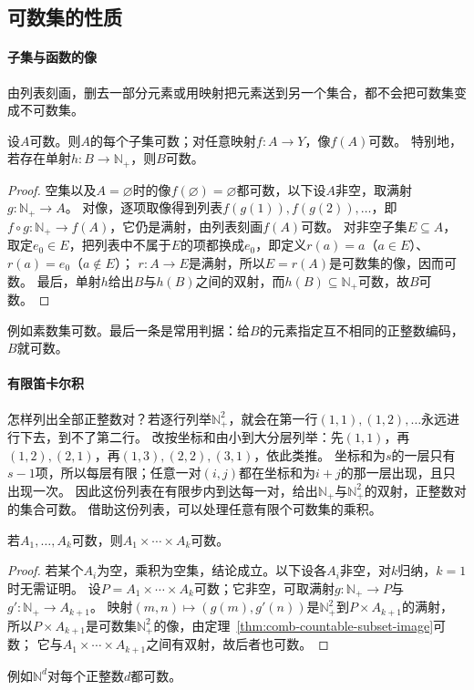 \subsection{可数集的性质}
\label{sec:countable-set-properties}

\paragraph{子集与函数的像}
由列表刻画，删去一部分元素或用映射把元素送到另一个集合，都不会把可数集变成不可数集。
\begin{theorem}[子集与像的可数性]
\label{thm:comb-countable-subset-image}
设$A$可数。则$A$的每个子集可数；对任意映射$f:A\to Y$，像$f(A)$可数。
特别地，若存在单射$h:B\to\mathbb N_+$，则$B$可数。
\end{theorem}
\begin{proof}
空集以及$A=\varnothing$时的像$f(\varnothing)=\varnothing$都可数，以下设$A$非空，取满射$g:\mathbb N_+\to A$。
对像，逐项取像得到列表$f(g(1)),f(g(2)),\ldots$，即$f\circ g:\mathbb N_+\to f(A)$，它仍是满射，由列表刻画$f(A)$可数。
对非空子集$E\subseteq A$，取定$e_0\in E$，把列表中不属于$E$的项都换成$e_0$，即定义$r(a)=a$（$a\in E$）、$r(a)=e_0$（$a\notin E$）；
$r:A\to E$是满射，所以$E=r(A)$是可数集的像，因而可数。
最后，单射$h$给出$B$与$h(B)$之间的双射，而$h(B)\subseteq\mathbb N_+$可数，故$B$可数。
\end{proof}
例如素数集可数。最后一条是常用判据：给$B$的元素指定互不相同的正整数编码，$B$就可数。

\paragraph{有限笛卡尔积}
怎样列出全部正整数对？若逐行列举$\mathbb N_+^2$，就会在第一行$(1,1),(1,2),\ldots$永远进行下去，到不了第二行。
改按坐标和由小到大分层列举：先$(1,1)$，再$(1,2),(2,1)$，再$(1,3),(2,2),(3,1)$，依此类推。
坐标和为$s$的一层只有$s-1$项，所以每层有限；任意一对$(i,j)$都在坐标和为$i+j$的那一层出现，且只出现一次。
因此这份列表在有限步内到达每一对，给出$\mathbb N_+$与$\mathbb N_+^2$的双射，正整数对的集合可数。
借助这份列表，可以处理任意有限个可数集的乘积。
\begin{theorem}[有限笛卡尔积的可数性]
\label{thm:comb-countable-product}
若$A_1,\ldots,A_k$可数，则$A_1\times\cdots\times A_k$可数。
\end{theorem}
\begin{proof}
若某个$A_i$为空，乘积为空集，结论成立。以下设各$A_i$非空，对$k$归纳，$k=1$时无需证明。
设$P=A_1\times\cdots\times A_k$可数；它非空，可取满射$g:\mathbb N_+\to P$与$g':\mathbb N_+\to A_{k+1}$。
映射$(m,n)\mapsto(g(m),g'(n))$是$\mathbb N_+^2$到$P\times A_{k+1}$的满射，
所以$P\times A_{k+1}$是可数集$\mathbb N_+^2$的像，由定理~\ref{thm:comb-countable-subset-image}可数；
它与$A_1\times\cdots\times A_{k+1}$之间有双射，故后者也可数。
\end{proof}
例如$\mathbb N^d$对每个正整数$d$都可数。

